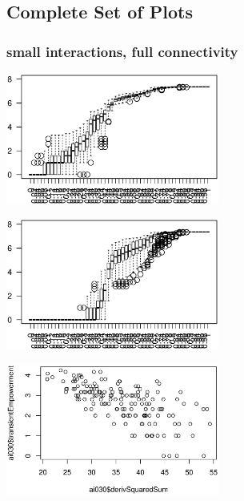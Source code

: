 \documentclass[conference]{IEEEtran}
\begin{document}





\cleardoublepage

\appendix

\subsection{Complete Set of Plots}


\subsubsection{small interactions, full connectivity}

\rule{0pt}{0pt}

\centerline{\includegraphics[width=7cm]{n08_full_small_emp.eps}}

\centerline{\includegraphics[width=7cm]{n08_full_small_empsust.eps}}

\centerline{\includegraphics[width=7cm]{n08_full_small_corr_dss_emp_ai030.eps}}
\end{document}
